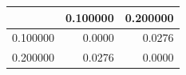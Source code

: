 \begin{tabular}{lrr}
\toprule
 & 0.100000 & 0.200000 \\
\midrule
0.100000 & 0.0000 & 0.0276 \\
0.200000 & 0.0276 & 0.0000 \\
\bottomrule
\end{tabular}
